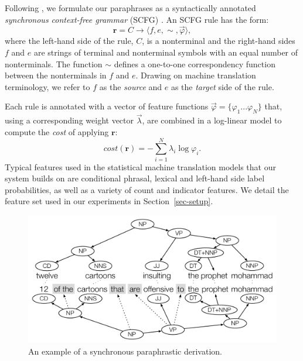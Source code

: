 \documentclass[11pt]{article}
\begin{document}
Following , we formulate our paraphrases as
a syntactically annotated \emph{ synchronous context-free grammar}
(SCFG) \cite{Aho1972,Chiang2005}.  An SCFG rule has the form:
\begin{equation*}
  \mathbf{r} = C \rightarrow \langle f, e, \sim, \vec{\varphi} \rangle ,
\end{equation*}
where the left-hand side of the rule, $C$, is a nonterminal and the
right-hand sides $f$ and $e$ are strings of terminal and nonterminal
symbols with an equal number of nonterminals. The function $\sim$
defines a one-to-one correspondency function between the nonterminals
in $f$ and $e$. Drawing on machine translation terminology, we refer
to $f$ as the \emph{source} and $e$ as the \emph{target}
side of the rule.

Each rule is annotated with a vector of feature functions
$\vec{\varphi} = \{\varphi_1 ... \varphi_N \}$ that, using a
corresponding weight vector $\vec{\lambda}$, are combined in a
log-linear model to compute the \emph{cost} of applying $\mathbf{r}$:
\begin{equation}
  \mathit{cost}(\mathbf{r}) = -\sum_{i=1}^N \lambda_i \log \varphi_i .
\end{equation}
Typical features used in the statistical machine translation models
that our system builds on are conditional phrasal, lexical and
left-hand side label probabilities, as well as a variety of count and
indicator features. We detail the feature set used in our experiments
in Section~\ref{sec-setup}.

\begin{figure}[!t]
\begin{center}
\includegraphics[width=0.99\linewidth]{figures/example_compression.pdf}
\end{center}
\caption{An example of a synchronous paraphrastic derivation.}
\label{fig-example-compression}
\end{figure}
\end{document}
